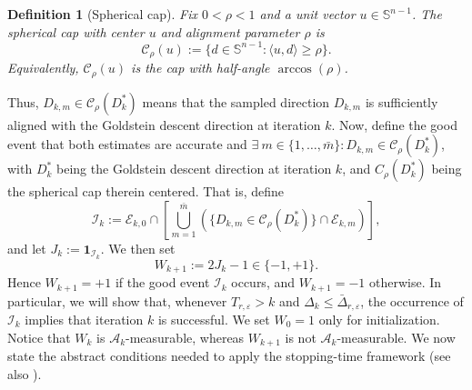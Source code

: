 \documentclass[11pt,a4paper]{article}
\newtheorem{definition}{Definition}[section]
\newcommand{\goldelta}{r}
\begin{document}
\begin{definition}[Spherical cap]
\label{def:spherical-cap-probability}
Fix \(0<\rho<1\) and a unit vector \(u\in\mathbb S^{n-1}\). The
\emph{spherical cap with center \(u\) and alignment parameter \(\rho\)} is
\[
    \mathcal C_\rho(u)
    :=
    \{d\in\mathbb S^{n-1}:\langle u,d\rangle\ge\rho\}.
\]
Equivalently, \(\mathcal C_\rho(u)\) is the cap with half-angle
\(\arccos(\rho)\). 
\end{definition}
Thus, \(D_{k,m}\in\mathcal C_\rho(D_k^*)\) means that the sampled direction
\(D_{k,m}\) is sufficiently aligned with the Goldstein descent direction at iteration $k$. Now, define the good event that both estimates are accurate and  $\exists\ m\in\{1,\ldots,\bar{m}\}:
D_{k,m}\in \mathcal C_\rho(D_k^\ast)$, with \(D_k^*\) being the Goldstein descent direction at iteration $k$, and \(C_\rho(D_k^\ast)\) being the spherical cap therein centered. That is, define
\[
\mathcal I_k
:=
\mathcal E_{k,0}
\cap
\left[
\bigcup_{m=1}^{\bar{m}}
\left(
\{D_{k,m}\in\mathcal C_\rho(D_k^*)\}
\cap
\mathcal E_{k,m}
\right)
\right],
\]
and let $J_k:=\mathbf 1_{\mathcal I_k}. $
We then set
\begin{equation} \label{eq:Wk}
    W_{k+1}:=2J_k-1\in\{-1,+1\}.
\end{equation}
Hence \(W_{k+1}=+1\) if the good event \(\mathcal I_k\) occurs, and
\(W_{k+1}=-1\) otherwise. In particular,
we will show that,
whenever \(T_{\goldelta,\varepsilon}>k\) and
\(\Delta_k\le \bar\Delta_{\goldelta,\varepsilon}\), the occurrence of \(\mathcal I_k\)
implies that iteration \(k\) is successful. We set \(W_0=1\) only for
initialization. Notice that \(W_k\) is \(\mathcal A_k\)-measurable, whereas
\(W_{k+1}\) is not \(\mathcal A_k\)-measurable. We now state the abstract conditions needed to apply the stopping-time
framework (see also \cite[Assumption 1]{MR4151319}).
\end{document}
